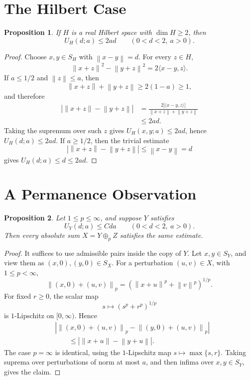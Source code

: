 \documentclass[11pt]{article}
\newtheorem{proposition}{Proposition}
\newcommand{\norm}[1]{\left\lVert #1 \right\rVert}
\begin{document}
\section*{The Hilbert Case}

\begin{proposition}
If \(H\) is a real Hilbert space with \(\dim H\ge 2\), then
\[
  U_H(d;a)\le 2ad
  \qquad (0<d<2,\ a>0).
\]
\end{proposition}

\begin{proof}
Choose \(x,y\in S_H\) with \(\norm{x-y}=d\).  For every \(z\in H\),
\[
  \norm{x+z}^2-\norm{y+z}^2
  =
  2\langle x-y,z\rangle.
\]
If \(a\le 1/2\) and \(\norm{z}\le a\), then
\[
  \norm{x+z}+\norm{y+z}
  \ge 2(1-a)\ge 1,
\]
and therefore
\[
\begin{aligned}
  \left|\norm{x+z}-\norm{y+z}\right|
  &=
  \frac{2|\langle x-y,z\rangle|}
       {\norm{x+z}+\norm{y+z}}       \\
  &\le 2ad.
\end{aligned}
\]
Taking the supremum over such \(z\) gives \(U_H(x,y;a)\le 2ad\), hence
\(U_H(d;a)\le 2ad\).  If \(a\ge 1/2\), then the trivial estimate
\[
  \left|\norm{x+z}-\norm{y+z}\right|\le \norm{x-y}=d
\]
gives \(U_H(d;a)\le d\le 2ad\).
\end{proof}

\section*{A Permanence Observation}

\begin{proposition}
Let \(1\le p\le \infty\), and suppose \(Y\) satisfies
\[
  U_Y(d;a)\le Cda
  \qquad (0<d<2,\ a>0).
\]
Then every absolute sum \(X=Y\oplus_p Z\) satisfies the same estimate.
\end{proposition}

\begin{proof}
It suffices to use admissible pairs inside the copy of \(Y\).  Let
\(x,y\in S_Y\), and view them as \((x,0),(y,0)\in S_X\).  For a
perturbation \((u,v)\in X\), with \(1\le p<\infty\),
\[
  \norm{(x,0)+(u,v)}_p
  =
  \left(\norm{x+u}^p+\norm{v}^p\right)^{1/p}.
\]
For fixed \(r\ge 0\), the scalar map
\[
  s\mapsto (s^p+r^p)^{1/p}
\]
is \(1\)-Lipschitz on \([0,\infty)\).  Hence
\[
\begin{aligned}
&\left|
  \norm{(x,0)+(u,v)}_p-\norm{(y,0)+(u,v)}_p
  \right|        \\
&\qquad\le
  \left|\norm{x+u}-\norm{y+u}\right|.
\end{aligned}
\]
The case \(p=\infty\) is identical, using the \(1\)-Lipschitz map
\(s\mapsto \max\{s,r\}\).  Taking suprema over perturbations of norm at
most \(a\), and then infima over \(x,y\in S_Y\), gives the claim.
\end{proof}
\end{document}
